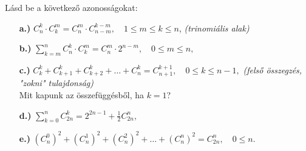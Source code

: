 \begin{problem}
\label{7sb8} Lásd be a következő azonosságokat: 
\begin{enumerate}
\item[{\small\textbf{a.)}}] ${\displaystyle C_{n}^{k}\cdot C_{k}^{m}=C_{n}^{m}\cdot C_{n-m}^{k-m},\quad1\leq m\leq k\leq n}$,
\hspace{0.3cm} \textit{(trinomiális alak)}

\vspace{0.3cm}

\item[{\small\textbf{b.)}}] ${\displaystyle \sum_{k=m}^{n}C_{n}^{k}\cdot C_{k}^{m}=C_{n}^{m}\cdot2^{n-m},\quad0\leq m\leq n,}$

\vspace{0.3cm}

\item[{\small\textbf{c.)}}] ${\displaystyle C_{k}^{k}+C_{k+1}^{k}+C_{k+2}^{k}+\ldots+C_{n}^{k}=C_{n+1}^{k+1},\quad0\leq k\leq n-1,}$
\textit{(felső összegzés, "zokni" tulajdonság)}\\
 Mit kapunk az összefüggésből, ha $k=1$?

\vspace{0.3cm}

\item[{\small\textbf{d.)}}] ${\displaystyle \sum_{k=0}^{n}C_{2n}^{k}=2^{2n-1}+\frac{1}{2}C_{2n}^{n},}$

\vspace{0.3cm}

\item[{\small\textbf{e.)}}] ${\displaystyle (C_{n}^{0})^{2}+(C_{n}^{1})^{2}+(C_{n}^{2})^{2}+\ldots+(C_{n}^{n})^{2}=C_{2n}^{n},\quad0\leq n.}$ 
\end{enumerate}
\end{problem}


